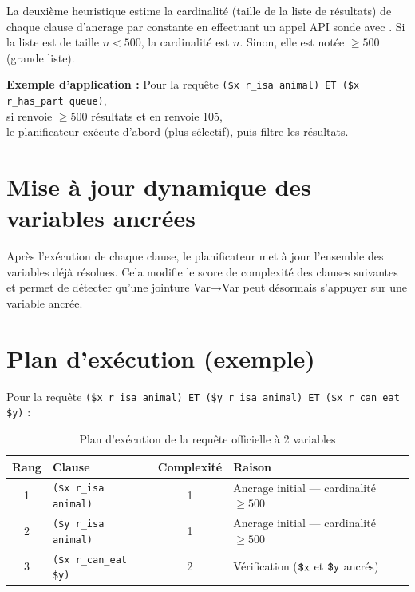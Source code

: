 La deuxième heuristique estime la cardinalité (taille de la liste de résultats) de chaque clause d'ancrage par constante en effectuant un appel API sonde avec . Si la liste est de taille $n < 500$, la cardinalité est $n$. Sinon, elle est notée $\geq 500$ (grande liste).

\begin{widobox}
\textbf{Exemple d'application :} Pour la requête \texttt{(\$x r\_isa animal) ET (\$x r\_has\_part queue)},\\
si  renvoie $\geq 500$ résultats et  en renvoie 105,\\
le planificateur exécute d'abord  (plus sélectif), puis filtre les résultats.
\end{widobox}

\section{Mise à jour dynamique des variables ancrées}

Après l'exécution de chaque clause, le planificateur met à jour l'ensemble des variables déjà résolues. Cela modifie le score de complexité des clauses suivantes et permet de détecter qu'une jointure Var→Var peut désormais s'appuyer sur une variable ancrée.

\section{Plan d'exécution (exemple)}

Pour la requête \texttt{(\$x r\_isa animal) ET (\$y r\_isa animal) ET (\$x r\_can\_eat \$y)} :

\begin{table}[H]
    \centering
    \begin{tabular}{clcl}
        \toprule
        Rang & Clause & Complexité & Raison \\
        \midrule
        1 & \texttt{(\$x r\_isa animal)} & 1 & Ancrage initial — cardinalité $\geq 500$ \\
        2 & \texttt{(\$y r\_isa animal)} & 1 & Ancrage initial — cardinalité $\geq 500$ \\
        3 & \texttt{(\$x r\_can\_eat \$y)} & 2 & Vérification ($\texttt{\$x}$ et $\texttt{\$y}$ ancrés) \\
        \bottomrule
    \end{tabular}
    \caption{Plan d'exécution de la requête officielle à 2 variables}
    \label{tab:plan}
\end{table}

